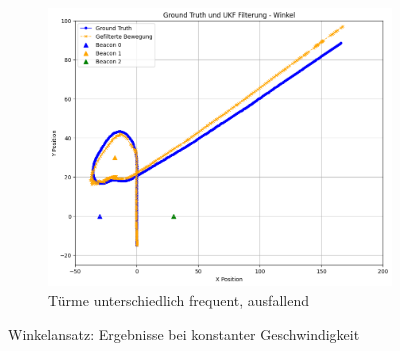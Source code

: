 \begin{figure}
\begin{subfigure}{.333\textwidth}
        \includegraphics[width=.9\linewidth]{Ergebnisse/plots_fahrten/winkel/winkel_dyn_acc_flag_freq.png}
        \caption{Türme unterschiedlich frequent, ausfallend}
    \end{subfigure}
    \caption{Winkelansatz: Ergebnisse bei konstanter Geschwindigkeit}
\end{figure}